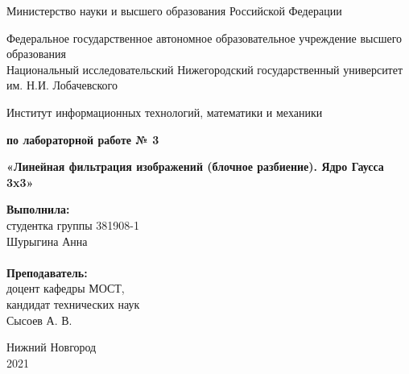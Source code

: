 \documentclass{report}
\begin{document}
\begin{titlepage}

\begin{center}
Министерство науки и высшего образования Российской Федерации
\end{center}

\begin{center}
Федеральное государственное автономное образовательное учреждение высшего образования \\
Национальный исследовательский Нижегородский государственный университет им. Н.И. Лобачевского
\end{center}

\begin{center}
Институт информационных технологий, математики и механики
\end{center}

\vspace{4em}

\begin{center}
\textbf{ по лабораторной работе № 3} \\
\end{center}
\begin{center}
\textbf{\Large«Линейная фильтрация изображений (блочное разбиение). Ядро Гаусса 3x3»} \\
\end{center}

\vspace{4em}

\newbox{\lbox}
\newlength{\maxl}
\setlength{\maxl}{\wd\lbox}
\hfill\parbox{7cm}{
\hspace*{5cm}\hspace*{-5cm}\textbf{Выполнила:} \\ студентка группы 381908-1 \\ Шурыгина Анна\\
\\
\hspace*{5cm}\hspace*{-5cm}\textbf{Преподаватель:}\\ доцент кафедры МОСТ, \\ кандидат технических наук \\ Сысоев А. В.\\
}
\vspace{\fill}

\begin{center} Нижний Новгород \\ 2021 \end{center}

\end{titlepage}
\end{document}
